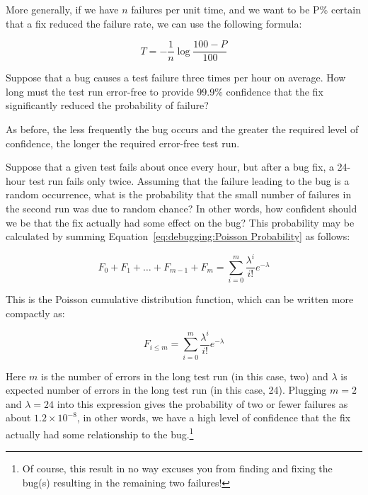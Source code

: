 More generally, if we have $n$ failures per unit time, and we want to
be P\% certain that a fix reduced the failure rate, we can use the
following formula:

\begin{equation}
	T = - \frac{1}{n} \log \frac{100 - P}{100}
\label{eq:debugging:Error-Free Test Duration}
\end{equation}

\QuickQuiz{}
	Suppose that a bug causes a test failure three times per hour
	on average.
	How long must the test run error-free to provide 99.9\%
	confidence that the fix significantly reduced the probability
	of failure?
 \QuickQuizEnd

As before, the less frequently the bug occurs and the greater the
required level of confidence, the longer the required error-free test run.

Suppose that a given test fails about once every hour, but after a bug
fix, a 24-hour test run fails only twice.
Assuming that the failure leading to the bug is a random occurrence,
what is the probability that the small number of
failures in the second run was due to random chance?
In other words, how confident should we be that the fix actually
had some effect on the bug?
This probability may be calculated by summing
Equation~\ref{eq:debugging:Poisson Probability} as follows:

\begin{equation}
	F_0 + F_1 + \dots + F_{m - 1} + F_m =
		\sum_{i=0}^m \frac{\lambda^i}{i!} e^{-\lambda}
\end{equation}

This is the Poisson cumulative distribution function, which can be
written more compactly as:

\begin{equation}
	F_{i \le m} = \sum_{i=0}^m \frac{\lambda^i}{i!} e^{-\lambda}
\label{eq:debugging:Possion CDF}
\end{equation}

Here $m$ is the number of errors in the long test run
(in this case, two) and $\lambda$ is expected number of errors
in the long test run (in this case, 24).
Plugging $m=2$ and $\lambda=24$ into this expression gives the probability
of two or fewer failures as about
$1.2 \times 10^{-8}$, in other words, we have a high level of confidence
that the fix actually had some relationship to the bug.\footnote{
	Of course, this result in no way excuses you from finding and
	fixing the bug(s) resulting in the remaining two failures!}

